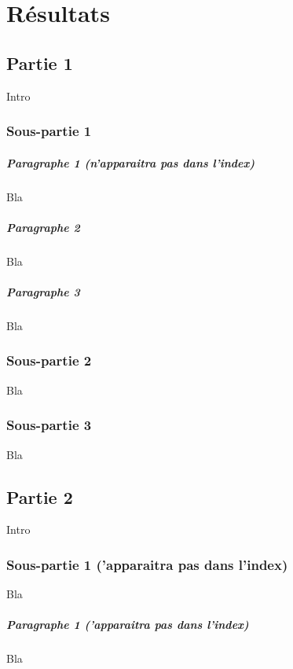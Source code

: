 \chapter{Résultats}

\section{Partie 1}

Intro

\subsection{Sous-partie 1}

\paragraph*{Paragraphe 1 (n'apparaitra pas dans l'index)} Bla

\paragraph*{Paragraphe 2} Bla

\paragraph*{Paragraphe 3} Bla

\subsection{Sous-partie 2}

Bla

\subsection{Sous-partie 3}

Bla

\section{Partie 2}

Intro

\subsection*{Sous-partie 1 ('apparaitra pas dans l'index)} Bla

\paragraph*{Paragraphe 1 ('apparaitra pas dans l'index)} Bla

